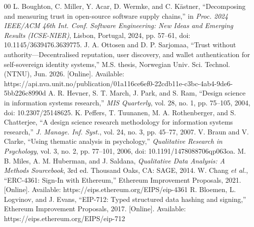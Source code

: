 \documentclass[10pt,conference]{IEEEtran}
\begin{document}
\begin{thebibliography}{00}
 L. Boughton, C. Miller, Y. Acar, D. Wermke, and C. K\"astner, ``Decomposing and measuring trust in open-source software supply chains,'' in \textit{Proc. 2024 IEEE/ACM 46th Int. Conf. Software Engineering: New Ideas and Emerging Results (ICSE-NIER)}, Lisbon, Portugal, 2024, pp. 57--61, doi: 10.1145/3639476.3639775.
 J. A. Ottosen and D. P. Sarjomaa, ``Trust without authority---Decentralised reputation, user discovery, and wallet authentication for self-sovereign identity systems,'' M.S. thesis, Norwegian Univ. Sci. Technol. (NTNU), Jun. 2026. [Online]. Available: https://api.nva.unit.no/publication/01a116ce6ef0-22cdb11e-c3bc-4ab4-9de6-5bb226c8990d
 A. R. Hevner, S. T. March, J. Park, and S. Ram, ``Design science in information systems research,'' \textit{MIS Quarterly}, vol. 28, no. 1, pp. 75--105, 2004, doi: 10.2307/25148625.
 K. Peffers, T. Tuunanen, M. A. Rothenberger, and S. Chatterjee, ``A design science research methodology for information systems research,'' \textit{J. Manage. Inf. Syst.}, vol. 24, no. 3, pp. 45--77, 2007.
 V. Braun and V. Clarke, ``Using thematic analysis in psychology,'' \textit{Qualitative Research in Psychology}, vol. 3, no. 2, pp. 77--101, 2006, doi: 10.1191/1478088706qp063oa.
 M. B. Miles, A. M. Huberman, and J. Saldana, \textit{Qualitative Data Analysis: A Methods Sourcebook}, 3rd ed. Thousand Oaks, CA: SAGE, 2014.
 W. Chang \textit{et al.}, ``ERC-4361: Sign-In with Ethereum,'' Ethereum Improvement Proposals, 2021. [Online]. Available: https://eips.ethereum.org/EIPS/eip-4361
 R. Bloemen, L. Logvinov, and J. Evans, ``EIP-712: Typed structured data hashing and signing,'' Ethereum Improvement Proposals, 2017. [Online]. Available: https://eips.ethereum.org/EIPS/eip-712
\end{thebibliography}
\end{document}
